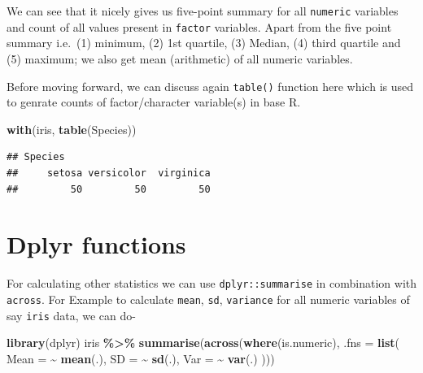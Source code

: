 \documentclass[
]{book}
\newenvironment{Shaded}{\begin{snugshade}}{\end{snugshade}}
\newcommand{\AttributeTok}[1]{\textcolor[rgb]{0.13,0.29,0.53}{#1}}
\newcommand{\FunctionTok}[1]{\textcolor[rgb]{0.13,0.29,0.53}{\textbf{#1}}}
\newcommand{\NormalTok}[1]{#1}
\newcommand{\SpecialCharTok}[1]{\textcolor[rgb]{0.81,0.36,0.00}{\textbf{#1}}}
\begin{document}
We can see that it nicely gives us five-point summary for all \texttt{numeric} variables and count of all values present in \texttt{factor} variables. Apart from the five point summary i.e.~(1) minimum, (2) 1st quartile, (3) Median, (4) third quartile and (5) maximum; we also get mean (arithmetic) of all numeric variables.

Before moving forward, we can discuss again \texttt{table()} function here which is used to genrate counts of factor/character variable(s) in base R.

\begin{Shaded}
\begin{Highlighting}[]
\FunctionTok{with}\NormalTok{(iris, }\FunctionTok{table}\NormalTok{(Species))}
\end{Highlighting}
\end{Shaded}

\begin{verbatim}
## Species
##     setosa versicolor  virginica 
##         50         50         50
\end{verbatim}

\hypertarget{dplyr-functions}{%
\section{Dplyr functions}\label{dplyr-functions}}

For calculating other statistics we can use \texttt{dplyr::summarise} in combination with \texttt{across}. For Example to calculate \texttt{mean}, \texttt{sd}, \texttt{variance} for all numeric variables of say \texttt{iris} data, we can do-

\begin{Shaded}
\begin{Highlighting}[]
\FunctionTok{library}\NormalTok{(dplyr)}
\NormalTok{iris }\SpecialCharTok{\%\textgreater{}\%}
  \FunctionTok{summarise}\NormalTok{(}\FunctionTok{across}\NormalTok{(}\FunctionTok{where}\NormalTok{(is.numeric),}
                   \AttributeTok{.fns =} \FunctionTok{list}\NormalTok{(}
                     \AttributeTok{Mean =} \SpecialCharTok{\textasciitilde{}} \FunctionTok{mean}\NormalTok{(.),}
                     \AttributeTok{SD =} \SpecialCharTok{\textasciitilde{}} \FunctionTok{sd}\NormalTok{(.),}
                     \AttributeTok{Var =} \SpecialCharTok{\textasciitilde{}} \FunctionTok{var}\NormalTok{(.)}
\NormalTok{                   )))}
\end{Highlighting}
\end{Shaded}
\end{document}
